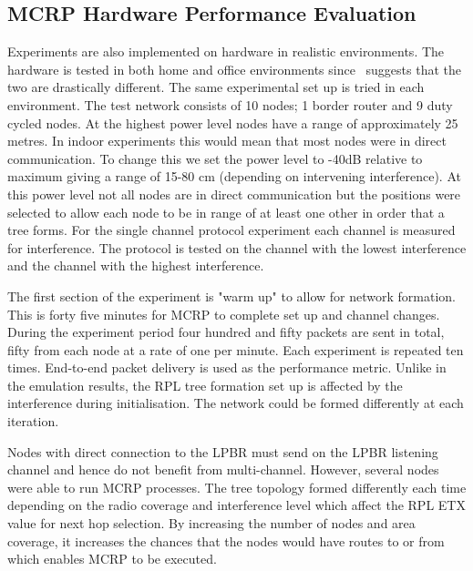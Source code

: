 \subsection{MCRP Hardware Performance Evaluation}
\label{MCRPhardware}

Experiments are also implemented on hardware in realistic environments.  The hardware is tested in both home and office environments since~\cite{homearea} suggests that the two are drastically different.  The same experimental set up is tried in each environment.  The test network consists of 10 nodes; 1 border router and 9 duty cycled nodes.  At the highest power level nodes have a range of approximately 25 metres.  In indoor experiments this would mean that most nodes were in direct communication.  To change this we set the power level to -40dB relative to maximum giving a range of 15-80 cm (depending on intervening interference).  At this power level not all nodes are in direct communication but the positions were selected to allow each node to be in range of at least one other in order that a tree forms.  For the single channel protocol experiment each channel is measured for interference.  The protocol is tested on the channel with the lowest interference and the channel with the highest interference.

The first section of the experiment is "warm up" to allow for network formation.  This is forty five minutes for MCRP to complete set up and channel changes. During the experiment period four hundred and fifty packets are sent in total, fifty from each node at a rate of one per minute.  Each experiment is repeated ten times.  End-to-end packet delivery is used as the performance metric.  Unlike in the emulation results, the RPL tree formation set up is affected by the interference during initialisation. The network could be formed differently at each iteration.  

Nodes with direct connection to the LPBR must send on the LPBR listening channel and hence do not benefit from multi-channel.  However, several nodes were able to run MCRP processes. The tree topology formed differently each time depending on the radio coverage and interference level which affect the RPL ETX value for next hop selection. By increasing the number of nodes and area coverage, it increases the chances that the nodes would have routes to or from which enables MCRP to be executed.  


